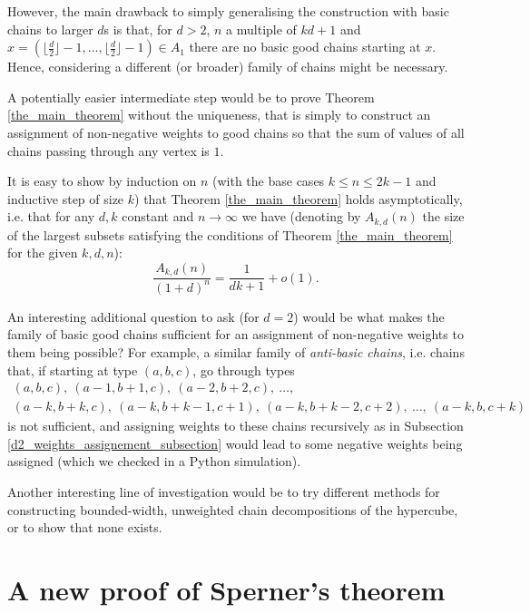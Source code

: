 \documentclass[11pt, reqno]{amsart}
\newcommand{\leanblueprintbase}{https://mj141592.github.io/weighted-chains-paper}
\newif\ifleanlinks
\newcommand{\leanblueprint}[1]{%
  \ifleanlinks
    \leavevmode\unskip\penalty9999\hbox{}\nobreak\hfill\quad
    \href{\leanblueprintbase/theorems/#1/}{%
      \mbox{\normalfont\footnotesize\textcolor{blue}{[\textsf{Lean formalisation}]}}}%
    \par\nobreak
  \fi
}
\theoremstyle{remark}
\numberwithin{equation}{section}
\begin{document}
However, the main drawback to simply generalising the construction with basic chains to larger $d$s is that, for $d>2$, $n$ a multiple of $kd+1$ and $x=(\lfloor \frac{d}{2} \rfloor -1, \dots, \lfloor \frac{d}{2} \rfloor-1) \in A_1$ there are no basic good chains starting at $x$. Hence, considering a different (or broader) family of chains might be necessary.

A potentially easier intermediate step would be to prove Theorem \ref{the_main_theorem} without the uniqueness, that is simply to construct an assignment of non-negative weights to good chains so that the sum of values of all chains passing through any vertex is $1$.

It is easy to show by induction on $n$ (with the base cases $k \leqslant n \leqslant 2k - 1$ and inductive step of size $k$) that Theorem \ref{the_main_theorem} holds asymptotically, i.e. that for any $d, k$ constant and $n \rightarrow \infty$ we have (denoting by $A_{k, d}(n)$ the size of the largest subsets satisfying the conditions of Theorem \ref{the_main_theorem} for the given $k, d, n$):
\begin{equation*}
    \frac{A_{k, d}(n)}{(1+d)^n} = \frac{1}{dk+1} + o(1).
\end{equation*}
\leanblueprint{asymptotic-density}
An interesting additional question to ask (for $d=2$) would be what makes the family of basic good chains sufficient for an assignment of non-negative weights to them being possible? For example, a similar family of \emph{anti-basic chains}, i.e. chains that, if starting at type $(a, b, c)$, go through types
\begin{multline*}
    (a, b, c), \ (a-1, b+1, c), \ (a-2, b+2, c), \ \ldots, \\
    (a-k, b+k, c), \ (a-k, b+k-1, c+1), \ (a-k, b+k-2, c+2), \ \ldots, \ (a-k, b, c+k)
\end{multline*}
is not sufficient, and assigning weights to these chains recursively as in Subsection \ref{d2_weights_assignement_subsection} would lead to some negative weights being assigned (which we checked in a Python simulation).

Another interesting line of investigation would be to try different methods for constructing bounded-width, unweighted chain decompositions of the hypercube, or to show that none exists.

\appendix

\section{A new proof of Sperner's theorem}
\label{appendix_sperner}
\end{document}
